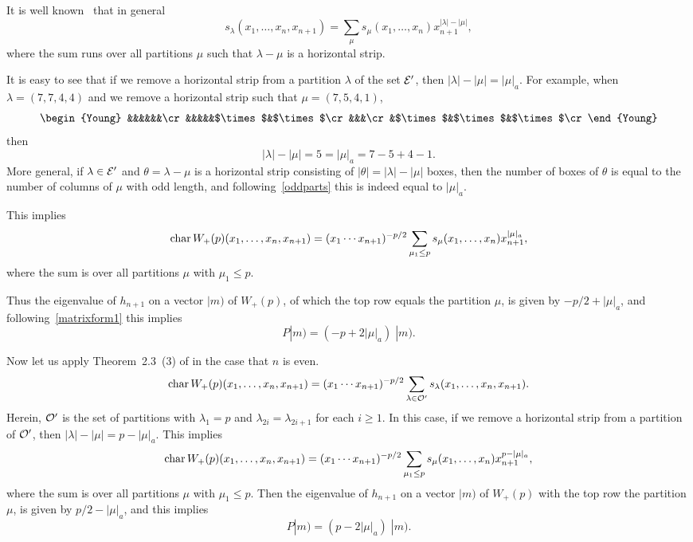 \documentclass{SciPost}
\begin{document}
It is well known~\cite{Macdonald} that in general
\begin{equation}
s_\lambda(x_1,\ldots,x_n,x_{n+1})=\sum_\mu s_\mu(x_1,\ldots,x_n) x_{n+1}^{|\lambda|-|\mu|},
\end{equation}
where the sum runs over all partitions $\mu$ such that $\lambda-\mu$ is a horizontal strip.

It is easy to see that if we remove a horizontal strip from a partition $\lambda$ of the set ${\cal E}'$, then $|\lambda|-|\mu|= |\mu|_a$. 
For example, when $\lambda=(7,7,4,4)$ and we remove a horizontal strip such that $\mu=(7,5,4,1)$, 
\[
\begin{Young}
&&&&&&\cr
&&&&&$\times$&$\times$\cr
&&&\cr
&$\times$&$\times$&$\times$\cr
\end{Young}
\]
then
\[
|\lambda|-|\mu| = 5 = |\mu|_a=7-5+4-1.
\]
More general, if $\lambda\in{\cal E}'$ and $\theta=\lambda-\mu$ is a horizontal strip consisting of $|\theta|=|\lambda|-|\mu|$ boxes,
then the number of boxes of $\theta$ is equal to the number of columns of $\mu$ with odd length, 
and following~\eqref{oddparts} this is indeed equal to $|\mu|_a$.

This implies
\begin{equation}
\mathop{\rm char}\nolimits W_+(p)(x_1,\ldots,x_n,x_{n+1})=(x_1\cdots x_{n+1})^{-p/2} \sum_{\mu_1\leq p} s_\mu(x_1,\ldots,x_n) x_{n+1}^{|\mu|_a},
\end{equation}
where the sum is over all partitions $\mu$ with $\mu_1\leq p$. 

Thus the eigenvalue of $h_{n+1}$ on a vector $|m)$ of $W_+(p)$, of which the top row equals the partition $\mu$, is given by
$-p/2+|\mu|_a$, and following~\eqref{matrixform1} this implies
\[
P |m) = (-p+2|\mu|_a) \; |m).
\]

Now let us apply Theorem~2.3~(3) of \cite{Okada} in the case that $n$ is even.
\begin{equation}
\mathop{\rm char}\nolimits W_+(p)(x_1,\ldots,x_n,x_{n+1})=(x_1\cdots x_{n+1})^{-p/2} \sum_{\lambda\in {\cal O}'} s_\lambda(x_1,\ldots,x_n,x_{n+1}).
\end{equation}
Herein, ${\cal O}'$ is the set of partitions with $\lambda_1=p$ and $\lambda_{2i}=\lambda_{2i+1}$ for each $i\geq 1$.
In this case, if we remove a horizontal strip from a partition of ${\cal O}'$, then $|\lambda|-|\mu|=p- |\mu|_a$. 
This implies
\begin{equation}
\mathop{\rm char}\nolimits W_+(p)(x_1,\ldots,x_n,x_{n+1})=(x_1\cdots x_{n+1})^{-p/2} \sum_{\mu_1\leq p} s_\mu(x_1,\ldots,x_n) x_{n+1}^{p-|\mu|_a},
\end{equation}
where the sum is over all partitions $\mu$ with $\mu_1\leq p$. 
Then the eigenvalue of $h_{n+1}$ on a vector $|m)$ of $W_+(p)$ with the top row the partition $\mu$, is given by
$p/2-|\mu|_a$, and this implies
\[
P |m) = (p-2|\mu|_a) \; |m).
\]
\end{document}
